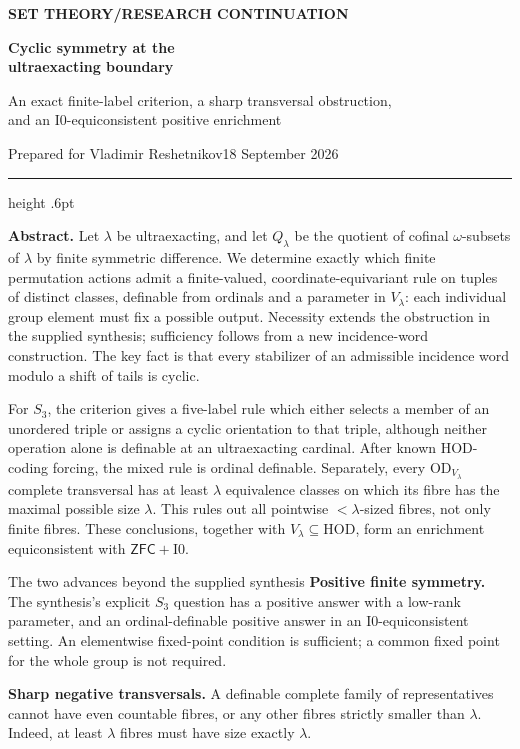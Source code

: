 \documentclass[11pt,letterpaper]{article}
\theoremstyle{definition}
\numberwithin{equation}{section}
\newcommand{\ZFC}{\mathsf{ZFC}}
\newcommand{\HOD}{\mathrm{HOD}}
\newcommand{\OD}{\mathrm{OD}}
\newcommand{\Izero}{\mathrm{I0}}
\begin{document}
\thispagestyle{empty}
{\sffamily\bfseries\small\color{Olive}SET THEORY\quad /\quad RESEARCH CONTINUATION}

\vspace{13pt}
{\fontsize{28}{31}\selectfont\bfseries\color{Forest}Cyclic symmetry at the\\ ultraexacting boundary\par}
\vspace{11pt}
{\fontsize{14}{18}\selectfont An exact finite-label criterion, a sharp transversal obstruction,\\ and an $\Izero$-equiconsistent positive enrichment\par}
\vspace{15pt}
{\color{Muted}Prepared for Vladimir Reshetnikov\hfill 18 September 2026\par}
\vspace{3pt}
{\color{Sage}\hrule height .6pt}
\vspace{12pt}

\textbf{Abstract.} Let $\lambda$ be ultraexacting, and let $Q_\lambda$ be the quotient of cofinal $\omega$-subsets of $\lambda$ by finite symmetric difference. We determine exactly which finite permutation actions admit a finite-valued, coordinate-equivariant rule on tuples of distinct classes, definable from ordinals and a parameter in $V_\lambda$: each individual group element must fix a possible output. Necessity extends the obstruction in the supplied synthesis; sufficiency follows from a new incidence-word construction. The key fact is that every stabilizer of an admissible incidence word modulo a shift of tails is cyclic.

For $S_3$, the criterion gives a five-label rule which either selects a member of an unordered triple or assigns a cyclic orientation to that triple, although neither operation alone is definable at an ultraexacting cardinal. After known HOD-coding forcing, the mixed rule is ordinal definable. Separately, every $\OD_{V_\lambda}$ complete transversal has at least $\lambda$ equivalence classes on which its fibre has the maximal possible size $\lambda$. This rules out all pointwise $<\lambda$-sized fibres, not only finite fibres. These conclusions, together with $V_\lambda\subseteq\HOD$, form an enrichment equiconsistent with $\ZFC+\Izero$.

\begin{assessment}{The two advances beyond the supplied synthesis}
\textbf{Positive finite symmetry.} The synthesis's explicit $S_3$ question has a positive answer with a low-rank parameter, and an ordinal-definable positive answer in an $\Izero$-equiconsistent setting. An elementwise fixed-point condition is sufficient; a common fixed point for the whole group is not required.

\textbf{Sharp negative transversals.} A definable complete family of representatives cannot have even countable fibres, or any other fibres strictly smaller than $\lambda$. Indeed, at least $\lambda$ fibres must have size exactly $\lambda$.
\end{assessment}
\end{document}
